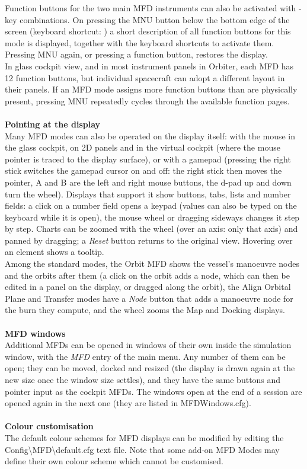 \documentclass[Orbiter User Manual.tex]{subfiles}
\begin{document}
\noindent
Function buttons for the two main MFD instruments can also be activated with \Shift-key combinations. On pressing the MNU button below the bottom edge of the screen (keyboard shortcut: \Shift{}) a short description of all function buttons for this mode is displayed, together with the keyboard shortcuts to activate them. Pressing MNU again, or pressing a function button, restores the display.\\
In glass cockpit view, and in most instrument panels in Orbiter, each MFD has 12 function buttons, but individual spacecraft can adopt a different layout in their panels. If an MFD mode assigns more function buttons than are physically present, pressing MNU repeatedly cycles through the available function pages.\\
\\
\textbf{Pointing at the display}\\
Many MFD modes can also be operated on the display itself: with the mouse in the glass cockpit, on 2D panels and in the virtual cockpit (where the mouse pointer is traced to the display surface), or with a gamepad (pressing the right stick switches the gamepad cursor on and off: the right stick then moves the pointer, A and B are the left and right mouse buttons, the d-pad up and down turn the wheel). Displays that support it show buttons, tabs, lists and number fields: a click on a number field opens a keypad (values can also be typed on the keyboard while it is open), the mouse wheel or dragging sideways changes it step by step. Charts can be zoomed with the wheel (over an axis: only that axis) and panned by dragging; a \textit{Reset} button returns to the original view. Hovering over an element shows a tooltip.\\
Among the standard modes, the Orbit MFD shows the vessel's manoeuvre nodes and the orbits after them (a click on the orbit adds a node, which can then be edited in a panel on the display, or dragged along the orbit), the Align Orbital Plane and Transfer modes have a \textit{Node} button that adds a manoeuvre node for the burn they compute, and the wheel zooms the Map and Docking displays.\\
\\
\textbf{MFD windows}\\
Additional MFDs can be opened in windows of their own inside the simulation window, with the \textit{MFD} entry of the main menu. Any number of them can be open; they can be moved, docked and resized (the display is drawn again at the new size once the window size settles), and they have the same buttons and pointer input as the cockpit MFDs. The windows open at the end of a session are opened again in the next one (they are listed in MFDWindows.cfg).\\
\\
\textbf{Colour customisation}\\
The default colour schemes for MFD displays can be modified by editing the Config\textbackslash MFD\textbackslash default.cfg text file. Note that some add-on MFD Modes may define their own colour scheme which cannot be customised.
\end{document}
